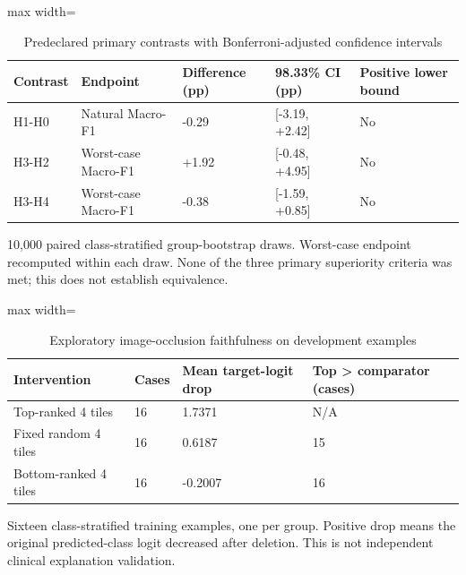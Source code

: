 \begin{table}[t]
\centering
\small
\caption{Predeclared primary contrasts with Bonferroni-adjusted confidence intervals}
\label{tab:09-primary-contrasts}
\begin{adjustbox}{max width=\textwidth}
\begin{tabular}{lllll}
\toprule
\textbf{Contrast} & \textbf{Endpoint} & \textbf{Difference (pp)} & \textbf{98.33\% CI (pp)} & \textbf{Positive lower bound} \\
\midrule
H1-H0 & Natural Macro-F1 & -0.29 & [-3.19, +2.42] & No \\
H3-H2 & Worst-case Macro-F1 & +1.92 & [-0.48, +4.95] & No \\
H3-H4 & Worst-case Macro-F1 & -0.38 & [-1.59, +0.85] & No \\
\bottomrule
\end{tabular}
\end{adjustbox}
\par\smallskip
\begin{minipage}{\textwidth}\footnotesize 10,000 paired class-stratified group-bootstrap draws. Worst-case endpoint recomputed within each draw. None of the three primary superiority criteria was met; this does not establish equivalence.\end{minipage}
\end{table}

\begin{table}[t]
\centering
\small
\caption{Exploratory image-occlusion faithfulness on development examples}
\label{tab:10-xai-occlusion}
\begin{adjustbox}{max width=\textwidth}
\begin{tabular}{llll}
\toprule
\textbf{Intervention} & \textbf{Cases} & \textbf{Mean target-logit drop} & \textbf{Top \textgreater{} comparator (cases)} \\
\midrule
Top-ranked 4 tiles & 16 & 1.7371 & N/A \\
Fixed random 4 tiles & 16 & 0.6187 & 15 \\
Bottom-ranked 4 tiles & 16 & -0.2007 & 16 \\
\bottomrule
\end{tabular}
\end{adjustbox}
\par\smallskip
\begin{minipage}{\textwidth}\footnotesize Sixteen class-stratified training examples, one per group. Positive drop means the original predicted-class logit decreased after deletion. This is not independent clinical explanation validation.\end{minipage}
\end{table}


